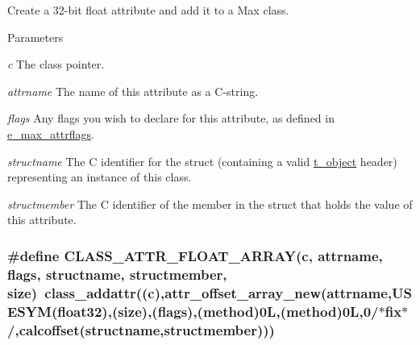 Create a 32-\/bit float attribute and add it to a Max class. 
\begin{DoxyParams}{Parameters}
\item[{\em c}]The class pointer. \item[{\em attrname}]The name of this attribute as a C-\/string. \item[{\em flags}]Any flags you wish to declare for this attribute, as defined in \hyperlink{group__attr_gaf296cfc6741bb19207f6ed8062809115}{e\_\-max\_\-attrflags}. \item[{\em structname}]The C identifier for the struct (containing a valid \hyperlink{structt__object}{t\_\-object} header) representing an instance of this class. \item[{\em structmember}]The C identifier of the member in the struct that holds the value of this attribute. \end{DoxyParams}
\hypertarget{group__attr_ga9cae895f2db30944f0e420ed2a32c825}{
\subsubsection[{CLASS\_\-ATTR\_\-FLOAT\_\-ARRAY}]{\setlength{\rightskip}{0pt plus 5cm}\#define CLASS\_\-ATTR\_\-FLOAT\_\-ARRAY(c, \/  attrname, \/  flags, \/  structname, \/  structmember, \/  size)~class\_\-addattr((c),attr\_\-offset\_\-array\_\-new(attrname,USESYM(float32),(size),(flags),({\bf method})0L,(method)0L,0/$\ast$fix$\ast$/,calcoffset(structname,structmember)))}}
\label{group__attr_ga9cae895f2db30944f0e420ed2a32c825}



